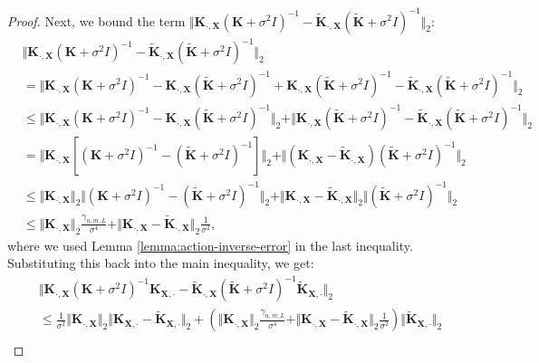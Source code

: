 \begin{proof}
Next, we bound the term $\Vert \textbf{K}_{\cdot,\textbf{X}} (\textbf{K}+\sigma^2 I)^{-1}-\tilde{\textbf{K}}_{\cdot,\textbf{X}} (\tilde{\textbf{K}}+\sigma^2 I)^{-1} \Vert_2$:
\begin{align*}
    &\Vert \textbf{K}_{\cdot,\textbf{X}} (\textbf{K}+\sigma^2 I)^{-1}-\tilde{\textbf{K}}_{\cdot,\textbf{X}} (\tilde{\textbf{K}}+\sigma^2 I)^{-1} \Vert_2 \\
    &= \Vert \textbf{K}_{\cdot,\textbf{X}} (\textbf{K}+\sigma^2 I)^{-1} - \textbf{K}_{\cdot,\textbf{X}} (\tilde{\textbf{K}}+\sigma^2 I)^{-1} + \textbf{K}_{\cdot,\textbf{X}} (\tilde{\textbf{K}}+\sigma^2 I)^{-1} - \tilde{\textbf{K}}_{\cdot,\textbf{X}} (\tilde{\textbf{K}}+\sigma^2 I)^{-1} \Vert_2 \\
    &\leq \Vert \textbf{K}_{\cdot,\textbf{X}} (\textbf{K}+\sigma^2 I)^{-1} - \textbf{K}_{\cdot,\textbf{X}} (\tilde{\textbf{K}}+\sigma^2 I)^{-1}\Vert_2 + \Vert \textbf{K}_{\cdot,\textbf{X}} (\tilde{\textbf{K}}+\sigma^2 I)^{-1} - \tilde{\textbf{K}}_{\cdot,\textbf{X}} (\tilde{\textbf{K}}+\sigma^2 I)^{-1} \Vert_2\\
    &= \Vert \textbf{K}_{\cdot,\textbf{X}} [(\textbf{K}+\sigma^2 I)^{-1} - (\tilde{\textbf{K}}+\sigma^2 I)^{-1}] \Vert_2 + \Vert (\textbf{K}_{\cdot,\textbf{X}} - \tilde{\textbf{K}}_{\cdot,\textbf{X}}) (\tilde{\textbf{K}}+\sigma^2 I)^{-1} \Vert_2\\
    &\leq \Vert \textbf{K}_{\cdot,\textbf{X}} \Vert_2 \Vert (\textbf{K}+\sigma^2 I)^{-1} - (\tilde{\textbf{K}}+\sigma^2 I)^{-1} \Vert_2 + \Vert \textbf{K}_{\cdot,\textbf{X}} - \tilde{\textbf{K}}_{\cdot,\textbf{X}} \Vert_2 \Vert (\tilde{\textbf{K}}+\sigma^2 I)^{-1} \Vert_2\\
    &\leq \Vert \textbf{K}_{\cdot,\textbf{X}} \Vert_2 \frac{\gamma_{n,m,L}}{\sigma^4} + \Vert \textbf{K}_{\cdot,\textbf{X}} - \tilde{\textbf{K}}_{\cdot,\textbf{X}} \Vert_2 \frac{1}{\sigma^2},
\end{align*}
where we used Lemma \ref{lemma:action-inverse-error} in the last inequality. Substituting this back into the main inequality, we get:
\begin{align*}
    &\Vert \textbf{K}_{\cdot,\textbf{X}} (\textbf{K}+\sigma^2 I)^{-1}\textbf{K}_{\textbf{X},\cdot}-\tilde{\textbf{K}}_{\cdot,\textbf{X}} (\tilde{\textbf{K}}+\sigma^2 I)^{-1}\tilde{\textbf{K}}_{\textbf{X},\cdot}\Vert_2 \\
    &\leq \frac{1}{\sigma^2} \Vert \textbf{K}_{\cdot,\textbf{X}}\Vert_2 \Vert \textbf{K}_{\textbf{X},\cdot}-\tilde{\textbf{K}}_{\textbf{X},\cdot}\Vert_2 + \left(\Vert \textbf{K}_{\cdot,\textbf{X}} \Vert_2 \frac{\gamma_{n,m,L}}{\sigma^4} + \Vert \textbf{K}_{\cdot,\textbf{X}} - \tilde{\textbf{K}}_{\cdot,\textbf{X}} \Vert_2 \frac{1}{\sigma^2}\right) \Vert \tilde{\textbf{K}}_{\textbf{X},\cdot} \Vert_2\\

\end{align*}
\end{proof}
